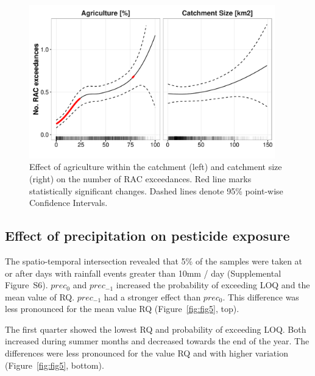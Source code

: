 \documentclass[journal=esthag,manuscript=article]{achemso}
\begin{document}
\begin{figure}[ht]
  \includegraphics[width=0.95\textwidth]{figure4.pdf}
  \caption{Effect of agriculture within the catchment (left) and catchment size (right) on the number of RAC exceedances. Red line marks statistically significant changes. Dashed lines denote 95\% point-wise Confidence Intervals.
  }
  \label{fig:fig4}
\end{figure}


\subsection{Effect of precipitation on pesticide exposure}
The spatio-temporal intersection revealed that 5\% of the samples were taken at or after days with rainfall events greater than 10mm / day (Supplemental Figure~S6).
$prec_{0}$ and $prec_{-1}$ increased the probability of exceeding LOQ and the mean value of RQ.
$prec_{-1}$ had a stronger effect than $prec_{0}$. 
This difference was less pronounced for the mean value RQ (Figure~\ref{fig:fig5}, top).

The first quarter showed the lowest RQ and probability of exceeding LOQ.
Both increased during summer months and decreased towards the end of the year.
The differences were less pronounced for the value RQ and with higher variation (Figure~\ref{fig:fig5}, bottom).
\end{document}
